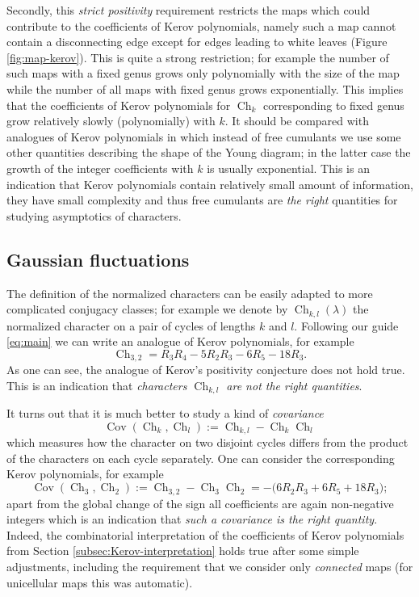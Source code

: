 \documentclass{emsprocart}
\theoremstyle{definition}
\begin{document}
Secondly, this \emph{strict positivity} requirement restricts the maps which
could contribute to the coefficients of Kerov polynomials, namely such a map cannot contain a disconnecting edge
except for edges leading to white leaves (Figure \ref{fig:map-kerov}).
This is quite a strong restriction; for example 
the number of such maps with a fixed genus grows only polynomially with the size of the map while the number of all maps with fixed genus grows exponentially.
This implies that the coefficients of Kerov polynomials for $\operatorname{Ch}_k$ corresponding to fixed genus grow relatively slowly (polynomially) with $k$.
It should be compared with analogues of Kerov polynomials in which instead of free cumulants we use some other quantities describing the shape of the Young diagram; in the latter case the growth of the integer 
coefficients with $k$ is usually
exponential. This is an indication that Kerov polynomials contain relatively small amount of information, they have small complexity and thus free cumulants are \emph{the right} quantities for
studying asymptotics of characters.

\subsection{Gaussian fluctuations}
The definition of the normalized characters
can be easily adapted to more complicated conjugacy classes; for example we denote by $\operatorname{Ch}_{k,l}(\lambda)$ the normalized character on a pair of cycles
of lengths $k$ and $l$.
Following our guide \eqref{eq:main} we can write an analogue of Kerov polynomials,
for example
$$ \operatorname{Ch}_{3,2} = R_3 R_4 - 5 R_2 R_3 - 6 R_5 - 18 R_3. $$
As one can see, the analogue of Kerov's positivity conjecture does not hold true.
This is an indication that \emph{characters $\operatorname{Ch}_{k,l}$ are not the right quantities}.

It turns out that it is much better to study a kind of \emph{covariance}
$$ \operatorname{Cov}(\operatorname{Ch}_k,\operatorname{Ch}_l):= \operatorname{Ch}_{k,l} - \operatorname{Ch}_k \operatorname{Ch}_l $$
which measures how the character on two disjoint cycles differs from the product of the characters on each cycle separately. One can consider the corresponding Kerov polynomials, for example
$$ \operatorname{Cov}(\operatorname{Ch}_3,\operatorname{Ch}_2):= \operatorname{Ch}_{3,2} - \operatorname{Ch}_3 \operatorname{Ch}_2 =  -\big( 6 R_2 R_3 + 6 R_5 + 18 R_3 \big); $$
apart from the global change of the sign all coefficients are again non-negative integers which is an indication that
\emph{such a covariance is the right  quantity}. Indeed, the combinatorial interpretation of the coefficients
of Kerov polynomials from Section \ref{subsec:Kerov-interpretation} holds true after some simple adjustments,
including the requirement that we consider only \emph{connected} maps (for unicellular maps this was automatic).
\end{document}
